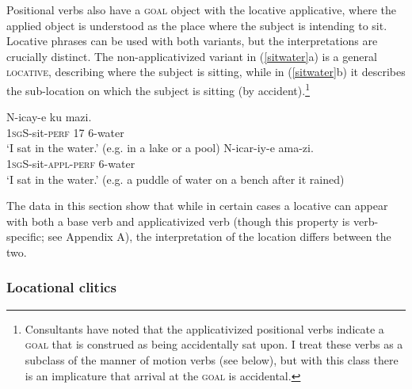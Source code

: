 \documentclass[output=paper]{langsci/langscibook}
\begin{document}
\fi

 Positional verbs also have a {\scshape goal} object with the locative applicative, where the applied object is understood as the place where the subject is intending to sit.  Locative phrases can be used with both variants, but the interpretations are crucially distinct. The non-applicativized variant in (\ref{sitwater}a) is a general {\scshape locative}, describing where the subject is sitting, while in (\ref{sitwater}b) it describes the sub-location on which the subject is sitting (by accident).\footnote{Consultants have noted that the applicativized positional verbs indicate a {\scshape goal}  that is construed as being accidentally sat upon. I treat these verbs as a subclass of the manner of motion verbs (see below), but with this class there is an implicature that arrival at the {\scshape goal}  is accidental.}
	\begin{exe}
		\ex\label{sitwater}\begin{xlist}
		\ex\gll N-icay-e ku mazi.\\
				1{\scshape sgS-}sit-{\scshape perf} 17 6-water\\
				\glt `I sat in the water.' (e.g. in a lake or a pool)
		\ex\gll N-icar-iy-e ama-zi.\\
				1{\scshape sgS-}sit-{\scshape appl-perf} 6-water\\
				\glt `I sat in the water.' (e.g. a puddle of water on a bench after it rained)
	\end{xlist}
	\end{exe}
%
The data in this section show that while in certain cases a locative can appear with both a base verb and applicativized verb (though this property is verb-specific; see Appendix A), the interpretation of the location differs between the two. 

\subsubsection{Locational clitics}%
\end{document}
